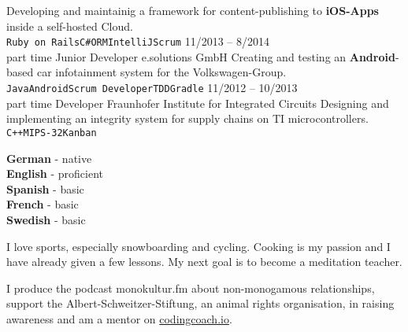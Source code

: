 \documentclass[9pt]{developercv} %
\begin{document}
\begin{entrylist}
		{
      Developing and maintainig a framework for content-publishing to \textbf{iOS-Apps} inside a self-hosted Cloud.\\
      \texttt{Ruby on Rails}\slashsep\texttt{C\#}\slashsep\texttt{ORM}\slashsep\texttt{IntelliJ}\slashsep\texttt{Scrum}
    }
  \entry
		{11/2013 -- 8/2014\\\footnotesize{part time}}
		{Junior Developer}
		{e.solutions GmbH}
		{
      Creating and testing an \textbf{Android}-based car infotainment system for the Volkswagen-Group.\\
      \texttt{Java}\slashsep\texttt{Android}\slashsep\texttt{Scrum Developer}\slashsep\texttt{TDD}\slashsep\texttt{Gradle}
    }
  \entry
		{11/2012 -- 10/2013\\\footnotesize{part time}}
		{Developer}
		{Fraunhofer Institute for Integrated Circuits}
		{
      Designing and implementing an integrity system for supply chains on TI microcontrollers.\\
      \texttt{C++}\slashsep\texttt{MIPS-32}\slashsep\texttt{Kanban}
    }
\end{entrylist}
\vspace{0.8cm}



\begin{minipage}[t]{0.3\textwidth}
	\vspace{-\baselineskip} %

	
	\textbf{German} - native\\
	\textbf{English} - proficient\\
	\textbf{Spanish} - basic\\
	\textbf{French} - basic\\
	\textbf{Swedish} - basic
\end{minipage}
\hfill
\begin{minipage}[t]{0.3\textwidth}
	\vspace{-\baselineskip} %
	
	
  I love sports, especially snowboarding and cycling.
  Cooking is my passion and I have already given a few lessons.
  My next goal is to become a meditation teacher.
\end{minipage}
\hfill
\begin{minipage}[t]{0.3\textwidth}
	\vspace{-\baselineskip} %
	
  
  I produce the podcast monokultur.fm about non-monogamous relationships,
  support the Albert-Schweitzer-Stiftung, an animal rights organisation, in raising awareness
  and am a mentor on \href{https://mentors.codingcoach.io/}{codingcoach.io}.
\end{minipage}
\end{document}
